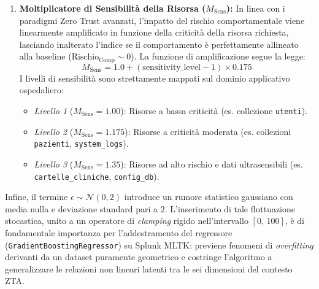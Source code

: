 \begin{enumerate}
\begin{itemize}
        \begin{equation}
            B_{\text{Inact}} = \min\left( \lfloor \text{days\_inactive} / 15 \rfloor \times 2, \, 8 \right)
        \end{equation}
        \item \textit{Severità dell'Operazione ($B_{\text{Action}}$):} Malus fisso di $+8$ punti qualora l'azione intercettata dal PEP preveda l'invocazione di comandi distruttivi o di alterazione strutturale sul database (\texttt{delete}, \texttt{drop}).
        \item \textit{Software Sospetto ($B_{\text{Soft}}$):} Incremento di $+4$ punti nel caso in cui l'analisi dell'handshake o dell'User-Agent riveli strumenti di scansione o librerie non standard (\texttt{nmap}, \texttt{metasploit}, \texttt{curl}, script automatizzati in Python).
    \end{itemize}

    \item \textbf{Moltiplicatore di Sensibilità della Risorsa ($M_{\text{Sens}}$):} In linea con i paradigmi Zero Trust avanzati, l'impatto del rischio comportamentale viene linearmente amplificato in funzione della criticità della risorsa richiesta, lasciando inalterato l'indice se il comportamento è perfettamente allineato alla baseline ($\text{Rischio}_{\text{Comp}} \sim 0$). La funzione di amplificazione segue la legge:
    \begin{equation}
        M_{\text{Sens}} = 1.0 + (\text{sensitivity\_level} - 1) \times 0.175
    \end{equation}
    I livelli di sensibilità sono strettamente mappati sul dominio applicativo ospedaliero:
    \begin{itemize}
        \item \textit{Livello 1} ($M_{\text{Sens}} = 1.00$): Risorse a bassa criticità (es. collezione \texttt{utenti}).
        \item \textit{Livello 2} ($M_{\text{Sens}} = 1.175$): Risorse a criticità moderata (es. collezioni \texttt{pazienti}, \texttt{system\_logs}).
        \item \textit{Livello 3} ($M_{\text{Sens}} = 1.35$): Risorse ad alto rischio e dati ultrasensibili (es. \texttt{cartelle\_cliniche}, \texttt{config\_db}).
    \end{itemize}
\end{enumerate}

Infine, il termine $\epsilon \sim \mathcal{N}(0, 2)$ introduce un rumore statistico gaussiano con media nulla e deviazione standard pari a $2$. L'inserimento di tale fluttuazione stocastica, unito a un operatore di \textit{clamping} rigido nell'intervallo $[0, \, 100]$, è di fondamentale importanza per l'addestramento del regressore (\texttt{GradientBoostingRegressor}) su Splunk MLTK: previene fenomeni di \textit{overfitting} derivanti da un dataset puramente geometrico e costringe l'algoritmo a generalizzare le relazioni non lineari latenti tra le sei dimensioni del contesto ZTA.


